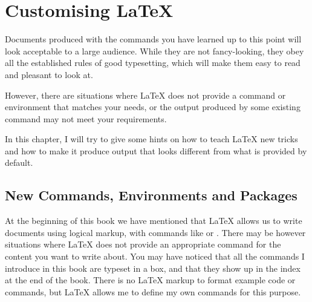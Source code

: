%
%
%
%

\chapter{Customising \LaTeX}\label{chap:custom}

\begin{intro}
  Documents produced with the commands you have learned up to this
  point will look acceptable to a large audience. While they are not
  fancy-looking, they obey all the established rules of good
  typesetting, which will make them easy to read and pleasant to look at.

  However, there are situations where \LaTeX{} does not provide a
  command or environment that matches your needs, or the output
  produced by some existing command may not meet your requirements.

  In this chapter, I will try to give some hints on
  how to teach \LaTeX{} new tricks and how to make it produce output
  that looks different from what is provided by default.
\end{intro}

\section{New Commands, Environments and Packages}

At the beginning of this book we have mentioned that \LaTeX{} allows us to
write documents using logical markup, with commands like  or
. There may be however situations where \LaTeX{} does not provide
an appropriate command for the content you want to write about.
You may have noticed that all the
commands I introduce in this book are typeset in a box, and that they show up
in the index at the end of the book. There is no \LaTeX{} markup to format
example code or commands, but \LaTeX{} allows me to define my own commands
for this purpose.


